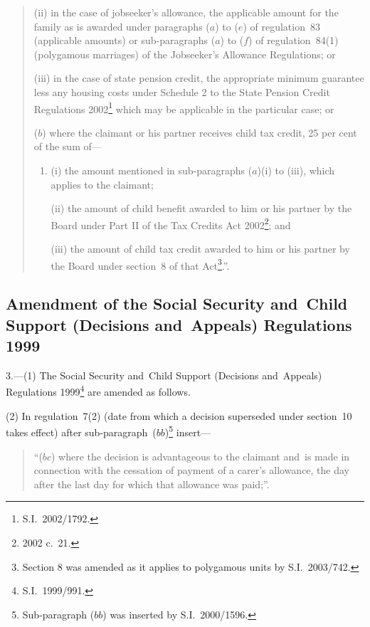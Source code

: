 \documentclass[12pt,a4paper]{article}
\begin{document}
\begin{enumerate}
\begin{enumerate}
\begin{quotation}
\begin{enumerate}
\begin{enumerate}
(ii) in the case of jobseeker’s allowance, the applicable amount for the family as is awarded under paragraphs ($a$)  to ($e$)  of regulation~83 (applicable amounts) or sub-paragraphs ($a$)  to ($f$)  of regulation~84(1) (polygamous marriages) of the Jobseeker’s Allowance Regulations; or

(iii) in the case of state pension credit, the appropriate minimum guarantee less any housing costs under Schedule 2 to the State Pension Credit Regulations 2002\footnote{S.I.~2002/1792.} which may be applicable in the particular case; or
\end{enumerate}

($b$) where the claimant or his partner receives child tax credit, 25 per cent of the sum of—
\begin{enumerate}\item[]
(i) the amount mentioned in sub-paragraphs ($a$)(i)  to (iii), which applies to the claimant;

(ii) the amount of child benefit awarded to him or his partner by the Board under Part II of the Tax Credits Act 2002\footnote{2002 c.~21.}; and

(iii) the amount of child tax credit awarded to him or his partner by the Board under section~8 of that Act\footnote{Section 8 was amended as it applies to polygamous units by S.I.~2003/742.}.”.
\end{enumerate}
\end{enumerate}
\end{quotation}
\end{enumerate}
\end{enumerate}

\subsection[3. Amendment of the Social Security and~Child Support (Decisions and~Appeals) Regulations 1999]{Amendment of the Social Security and~Child Support (Decisions and~Appeals) Regulations 1999}

3.---(1)  The Social Security and~Child Support (Decisions and~Appeals) Regulations 1999\footnote{S.I.~1999/991.} are amended as follows.

(2) In regulation~7(2) (date from which a decision superseded under section~10 takes effect) after sub-paragraph~($bb$)\footnote{Sub-paragraph ($bb$) was inserted by S.I.~2000/1596.}  insert—
\begin{quotation}
“($bc$) where the decision is advantageous to the claimant and~is made in connection with the cessation of payment of a carer’s allowance, the day after the last day for which that allowance was paid;”.
\end{quotation}
\end{document}
